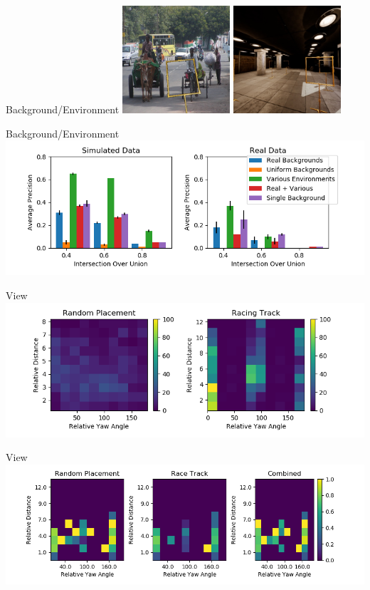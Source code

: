 \documentclass{beamer}
\begin{document}
\begin{darkframes}
\begin{frame}{Background/Environment}
			\includegraphics[width=0.3\textwidth]{fig/example_real2}
			\includegraphics[width=0.3\textwidth]{fig/example_virt2}
    \end{frame}
    \begin{frame}{Background/Environment}
    \includegraphics[width=\textwidth]{../../thesis/fig/context_bar}
    \end{frame}

    \begin{frame}{View}
	\includegraphics[width=\textwidth]{../../thesis/fig/hist2d_camplace}
	\end{frame}

    \begin{frame}{View}
    \includegraphics[width=\textwidth]{../../thesis/fig/recall_yaw}
	\end{frame}


\end{darkframes}
\end{document}
